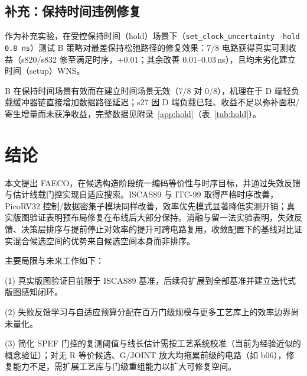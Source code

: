 \documentclass[journal]{IEEEtran}
\begin{document}
\subsection{补充：保持时间违例修复}\label{sec:hold}

作为补充实验，在受控保持时间（hold）场景下（\texttt{set\_clock\_uncertainty -hold 0.8\,ns}）测试 B 策略对最差保持松弛路径的修复效果：7/8 电路获得真实可测收益（s820/s832 修至满足时序，$+0.01$；其余改善 $0.01$--$0.03\,$ns），且均未劣化建立时间（setup）WNS。

B 在保持时间场景有效而在建立时间场景无效（7/8 对 0/8），机理在于 D 端轻负载缓冲器链直接增加数据路径延迟；s27 因 D 端负载已轻、收益不足以弥补面积/寄生增量而未获净收益，完整数据见附录~\ref{app:hold}（表~\ref{tab:hold}）。

\section{结论}\label{sec:conclusion}

本文提出 FAECO，在候选构造阶段统一编码等价性与时序目标，并通过失效反馈与估计线载门控实现自适应搜索。ISCAS89 与 ITC-99 取得严格时序改善，PicoRV32 控制/数据密集子模块同样改善，效率优先模式显著降低实测开销；真实版图验证表明预布局修复在布线后大部分保持。消融与留一法实验表明，失效反馈、决策层排序与提前停止对效率的提升可跨电路复用，收敛配置下的基线对比证实混合候选空间的优势来自候选空间本身而非排序。

主要局限与未来工作如下：

(1) 真实版图验证目前限于 ISCAS89 基准，后续将扩展到全部基准并建立迭代式版图感知闭环。

(2) 失败反馈学习与自适应预算分配在百万门级规模与更多工艺库上的效率边界尚未量化。

(3) 简化 SPEF 门控的复测阈值与线长估计需按工艺系统校准（当前为经验近似的概念验证）；对无 R 等价候选、G/JOINT 放大均拖累前级的电路（如 b06），修复能力不足，需扩展工艺库与门级重组能力以扩大可修复空间。
\end{document}
